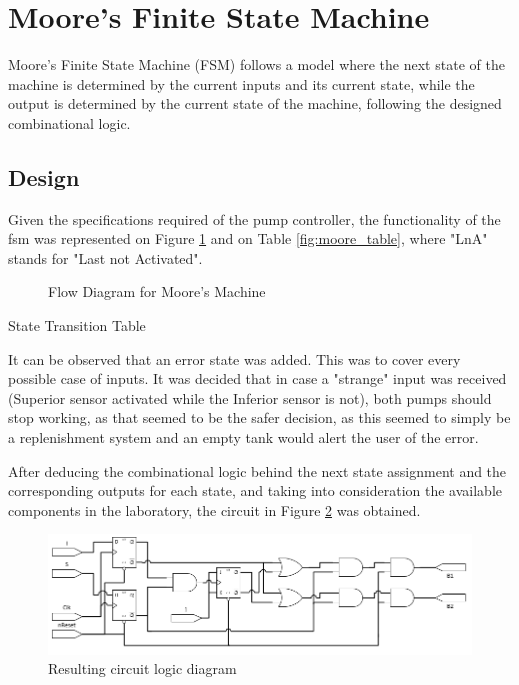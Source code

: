 \section{Moore's Finite State Machine}

Moore's Finite State Machine (FSM) follows a model where the next state of the machine is determined by the current
inputs and its current state, while the output is determined by the current state of the machine, following the
designed combinational logic.

\subsection{Design}

Given the specifications required of the pump controller, the functionality of the fsm was represented
on Figure \ref{fig:moore_flow} and on Table \ref{fig:moore_table}, where "LnA" stands for "Last not Activated".

\begin{figure}[h]
    \begin{center}
        
        \caption{Flow Diagram for Moore's Machine}
        \label{fig:moore_flow}
    \end{center}
\end{figure}

\begin{table}[ht]
    \begin{center}
        
        \caption{State Transition Table}
        \label{fig:moore_table}
    \end{center}
\end{table}

It can be observed that an error state was added. This was to cover every possible case of inputs. It was decided that
in case a "strange" input was received (Superior sensor activated while the Inferior sensor is not), both pumps should
stop working, as that seemed to be the safer decision, as this seemed to simply be a replenishment system and an empty
tank would alert the user of the error.

After deducing the combinational logic behind the next state assignment and the corresponding outputs for each state,
and taking into consideration the available components in the laboratory, the circuit in Figure \ref{fig:moore_circuit}
was obtained.

\begin{figure}
    \begin{center}
        \includegraphics[width=\linewidth]{./circuit.png}
        \caption{Resulting circuit logic diagram}
        \label{fig:moore_circuit}
    \end{center}
\end{figure}

